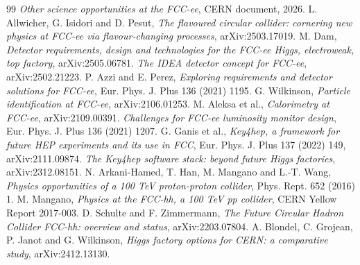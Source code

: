 \documentclass[11pt,a4paper]{article}
\numberwithin{equation}{section}
\begin{document}
\begin{thebibliography}{99}
 \emph{Other science opportunities at the FCC-ee}, CERN document, 2026.
 L. Allwicher, G. Isidori and D. Pesut, \emph{The flavoured circular collider: cornering new physics at FCC-ee via flavour-changing processes}, arXiv:2503.17019.
 M. Dam, \emph{Detector requirements, design and technologies for the FCC-ee Higgs, electroweak, top factory}, arXiv:2505.06781.
 \emph{The IDEA detector concept for FCC-ee}, arXiv:2502.21223.
 P. Azzi and E. Perez, \emph{Exploring requirements and detector solutions for FCC-ee}, Eur. Phys. J. Plus 136 (2021) 1195.
 G. Wilkinson, \emph{Particle identification at FCC-ee}, arXiv:2106.01253.
 M. Aleksa et al., \emph{Calorimetry at FCC-ee}, arXiv:2109.00391.
 \emph{Challenges for FCC-ee luminosity monitor design}, Eur. Phys. J. Plus 136 (2021) 1207.
 G. Ganis et al., \emph{Key4hep, a framework for future HEP experiments and its use in FCC}, Eur. Phys. J. Plus 137 (2022) 149, arXiv:2111.09874.
 \emph{The Key4hep software stack: beyond future Higgs factories}, arXiv:2312.08151.
 N. Arkani-Hamed, T. Han, M. Mangano and L.-T. Wang, \emph{Physics opportunities of a 100 TeV proton-proton collider}, Phys. Rept. 652 (2016) 1.
 M. Mangano, \emph{Physics at the FCC-hh, a 100 TeV pp collider}, CERN Yellow Report 2017-003.
 D. Schulte and F. Zimmermann, \emph{The Future Circular Hadron Collider FCC-hh: overview and status}, arXiv:2203.07804.
 A. Blondel, C. Grojean, P. Janot and G. Wilkinson, \emph{Higgs factory options for CERN: a comparative study}, arXiv:2412.13130.
\end{thebibliography}
\end{document}
